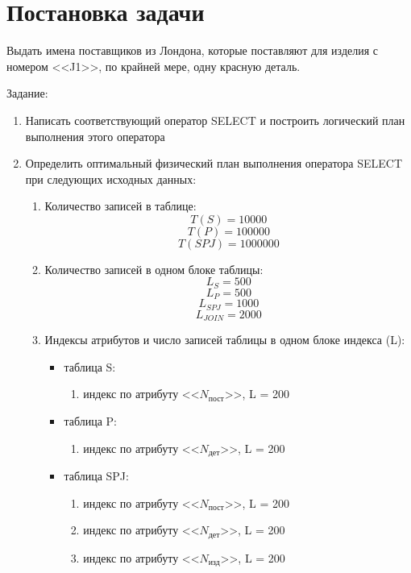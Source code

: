 \documentclass[russian,utf8,emptystyle]{eskdtext}
\begin{document}
\maketitle
%

\tableofcontents
\clearpage

\section{Постановка задачи}

Выдать имена поставщиков из Лондона, которые поставляют для изделия с номером <<J1>>, по крайней мере, одну красную деталь.

Задание:
\begin{enumerate}[label=\arabic*.]
\item Написать соответствующий оператор SELECT и построить логический план выполнения этого оператора
\item Определить оптимальный физический план выполнения оператора SELECT при следующих исходных данных:
\begin{enumerate}[label=\arabic*)]
\item Количество записей в таблице:
$$
T(S) = 10000
$$
$$
T(P) = 100000
$$
$$
T(SPJ) = 1000000
$$
\item Количество записей в одном блоке таблицы:
$$
L_S = 500
$$
$$
L_P = 500
$$
$$
L_{SPJ} = 1000
$$
$$
L_{JOIN} = 2000
$$
\item Индексы атрибутов и число записей таблицы в одном блоке индекса (L):
\begin{itemize}
\item таблица S: 
\begin{enumerate}[label=\arabic*)]
\item индекс по атрибуту <<$N_\text{пост}$>>, L = 200
\end{enumerate}
\item таблица P:
\begin{enumerate}[label=\arabic*)]
\item индекс по атрибуту <<$N_\text{дет}$>>, L = 200
\end{enumerate}
\item таблица SPJ:
\begin{enumerate}[label=\arabic*)]
\item индекс по атрибуту <<$N_\text{пост}$>>, L = 200
\item индекс по атрибуту <<$N_\text{дет}$>>, L = 200
\item индекс по атрибуту <<$N_\text{изд}$>>, L = 200
\end{enumerate}
\end{itemize}
\end{enumerate}


\end{enumerate}
\end{document}
